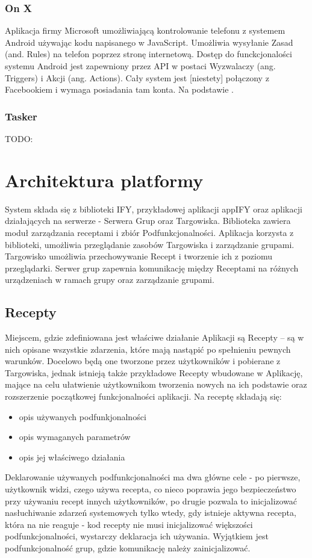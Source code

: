\documentclass[11pt,a4paper,polish,thesis]{dcsbook}
\begin{document}
\subsection{On X}
Aplikacja firmy Microsoft umożliwiającą kontrolowanie telefonu z systemem Android używając kodu napisanego w JavaScript. Umożliwia wysyłanie Zasad (and. Rules) na
telefon poprzez stronę internetową. Dostęp do funckcjonalości systemu Android jest zapewniony przez API w postaci Wyzwalaczy (ang. Triggers) i Akcji (ang. Actions).
Cały system jest [niestety] połączony z Facebookiem i wymaga posiadania tam konta. Na podstawie \cite{onx}.
\subsection{Tasker}
TODO:

\chapter{Architektura platformy}
System składa się z biblioteki IFY, przykładowej aplikacji appIFY oraz aplikacji działających na serwerze - Serwera Grup oraz Targowiska.
Biblioteka zawiera moduł zarządzania receptami i zbiór Podfunkcjonalności.
Aplikacja korzysta z biblioteki, umożliwia przeglądanie zasobów Targowiska i zarządzanie grupami. 
Targowisko umożliwia przechowywanie Recept i tworzenie ich z poziomu przeglądarki.
Serwer grup zapewnia komunikację między Receptami na różnych urządzeniach w ramach grupy oraz zarządzanie grupami.

\section{Recepty}
Miejscem, gdzie zdefiniowana jest właściwe działanie Aplikacji są Recepty -- są w nich opisane wszystkie zdarzenia, które mają nastąpić po spełnieniu pewnych warunków. Docelowo będą one tworzone przez użytkowników i pobierane z Targowiska, jednak istnieją także przykładowe Recepty wbudowane w Aplikację, mające na celu ułatwienie użytkownikom tworzenia nowych na ich podstawie oraz rozszerzenie początkowej funkcjonalności aplikacji. 
Na receptę składają się:
\begin{itemize}
\item  opis używanych podfunkjonalności
\item  opis wymaganych parametrów
\item  opis jej właściwego działania
\end{itemize}
Deklarowanie używanych podfunkcjonalności ma dwa główne cele - po pierwsze, użytkownik widzi, czego używa recepta, co nieco poprawia jego bezpieczeństwo przy używaniu recept innych użytkowników, po drugie pozwala to inicjalizować nasłuchiwanie zdarzeń systemowych tylko wtedy, gdy istnieje aktywna recepta, która na nie reaguje - kod recepty nie musi inicjalizować większości podfunkcjonalności, wystarczy deklaracja ich używania. Wyjątkiem jest podfunkcjonalność grup, gdzie komunikację należy zainicjalizować.
\end{document}
